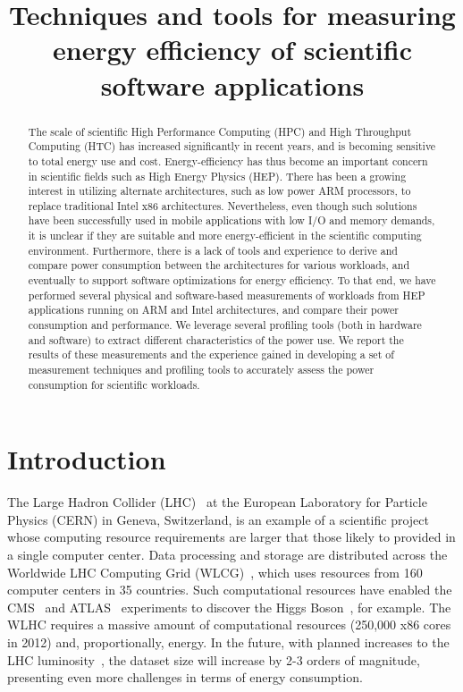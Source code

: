 \title{Techniques and tools for measuring energy efficiency of scientific software applications}






\begin{abstract}
The scale of scientific High Performance Computing (HPC) and High 
Throughput Computing (HTC) has increased significantly in recent years,
and is becoming sensitive to total energy use and cost.
Energy-efficiency
has thus become an important concern in scientific fields such as High
Energy Physics (HEP). There has been a growing interest in utilizing
alternate architectures, such as low power ARM processors, to replace 
traditional
Intel x86 architectures. Nevertheless, even though such solutions
have been successfully used in mobile applications with low I/O and
memory demands, it is unclear if they are suitable and more
energy-efficient in the scientific computing environment. Furthermore,
there is a lack of tools and experience to derive and compare power 
consumption between the architectures for various workloads, and 
eventually to support software optimizations for energy efficiency.
To that end, we have performed several physical and software-based
measurements of workloads from HEP applications running on ARM and Intel
architectures, and compare their power consumption and performance.
We leverage several profiling tools (both in hardware and software)
to extract different characteristics of the power use. 
We report the results of these measurements and
the experience gained in developing a set of measurement techniques
and profiling tools to accurately assess the power consumption for
scientific workloads. 
\end{abstract}

\section{Introduction}

The Large Hadron Collider (LHC)~\cite{LHCPAPER} at the European
Laboratory for Particle Physics (CERN) in Geneva, Switzerland, is
an example of a scientific project whose computing resource requirements are
larger that those likely to provided in a single
computer center. Data processing and storage are distributed
across the Worldwide LHC Computing Grid (WLCG)~\cite{WLHC}, which
uses resources from 160 computer centers in 35 countries.
Such computational resources have enabled the
CMS~\cite{CMSDET} and ATLAS~\cite{ATLAS} experiments 
to discover the Higgs Boson~\cite{CMSHIGGS,
ATLASHIGGS}, for example. The WLHC requires
a massive amount of computational resources (250,000 x86 cores in
2012) and, proportionally,
energy. 
In the future, with planned increases to the LHC luminosity~\cite{HLLHC},
the dataset size will increase by 2-3 orders of magnitude, presenting even 
more challenges in terms of energy consumption. 

